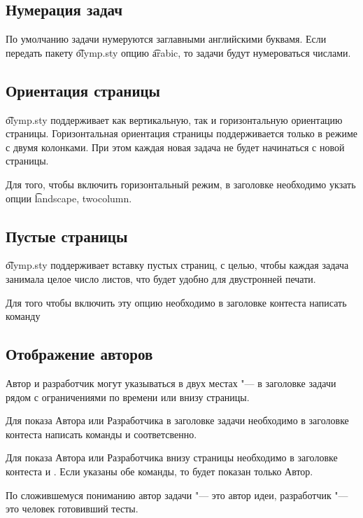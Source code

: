 \documentclass[11pt,a4paper,oneside]{article}
\begin{document}
\subsection{Нумерация задач}

По умолчанию задачи нумеруются заглавными английскими буквамя. Если передать пакету 
\t{olymp.sty} опцию \t{arabic}, то задачи будут нумероваться числами.

\subsection{Ориентация страницы}

\t{olymp.sty} поддерживает как вертикальную, так и горизонтальную ориентацию страницы.
Горизонтальная ориентация страницы поддерживается только в режиме с двумя колонками.
При этом каждая новая задача не будет начинаться с новой страницы.

Для того, чтобы включить горизонтальный режим, в заголовке 
необходимо укзать опции \t{landscape, twocolumn}.

\subsection{Пустые страницы}
\t{olymp.sty} поддерживает вставку пустых страниц, с целью, чтобы каждая задача занимала
целое число листов, что будет удобно для двустронней печати.

Для того чтобы включить эту опцию необходимо в заголовке контеста написать команду

\subsection{Отображение авторов}
Автор и разработчик могут указываться в двух местах "--- в заголовке задачи
рядом с ограничениями по времени или внизу страницы.

Для показа Автора или Разработчика в заголовке задачи необходимо в заголовке контеста 
написать команды 
 и
 соответсвенно.

Для показа Автора или Разработчика внизу страницы необходимо в заголовке контеста 
 и . 
Если указаны обе команды, то будет показан только Автор.

По сложившемуся пониманию автор задачи "--- это автор идеи, разработчик "--- это
человек готовивший тесты.
\end{document}
